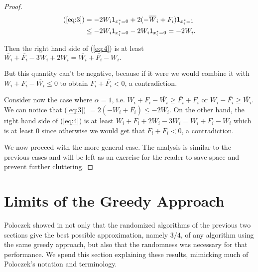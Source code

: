 \documentclass[11pt,letter]{article}
\numberwithin{theorem}{section}
\begin{document}
\begin{proof}
\begin{equation*}
\begin{aligned}
(\ref{eq:3}) & = -2W_i \mathsf{1}_{x_i^* = 0} + 2(-\overline{W}_i + F_i) \mathsf{1}_{x_i^* = 1} \\ 
& \leq  -2W_i \mathsf{1}_{x_i^* = 0} - 2W_i \mathsf{1}_{x_i^* = 0} = -2W_i.
\end{aligned}
\end{equation*} 

Then the right hand side of (\ref{eq:4}) is at least $\overline{W_i} + \overline{F_i} - 3W_i + 2W_i =
\overline{W_i} + \overline{F_i} - W_i.$ 

But this quantity can't be negative, because if it were we would combine it with $W_i + F_i - \overline{W_i} \leq 0$ to obtain $F_i +
\overline{F_i} < 0$, a contradiction.

Consider now the case where $\alpha = 1$, i.e. $W_i + F_i -\overline{W_i} \geq \overline{F_i} + F_i$ or $W_i - \overline{F_i} \geq \overline{W_i}$.
We can notice that (\ref{eq:3}) $= 2(-W_i + \overline{F_i}) \leq -2\overline{W_i}$. On the other hand, the right hand side of  (\ref{eq:4})
is at least $W_i + F_i + 2\overline{W_i} -3\overline{W_i} = W_i + F_i - \overline{W_i}$ which is at least $0$ since otherwise we would get
that $F_i + \overline{F_i} < 0$, a contradiction.

We now proceed with the more general case. The analysis is similar to the previous cases and will be left as an exercise
for the reader to save space and prevent further cluttering.

\end{proof}


\section{Limits of the Greedy Approach}\label{S:limits}

Poloczek showed in \cite{DBLP:conf/esa/Poloczek11} not only that
the randomized algorithms of the previous two sections
give the best possible approximation, namely $3/4$,
of any algorithm using the same greedy approach,
but also that the randomness was necessary for that performance.
We spend this section explaining these results,
mimicking much of Poloczek's notation and terminology.
\end{document}
